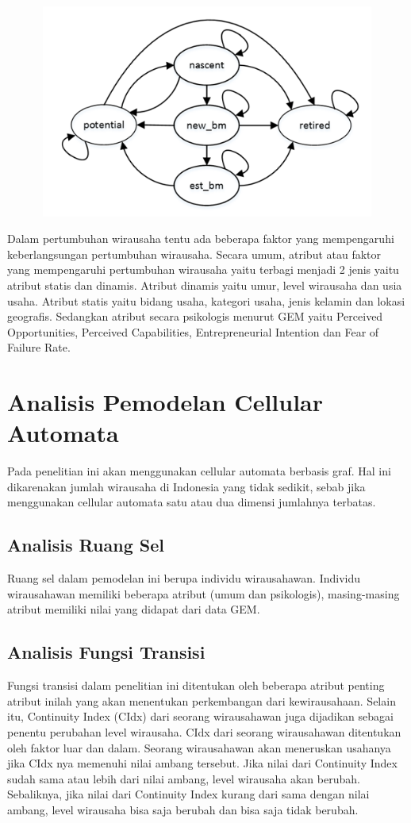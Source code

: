 \begin{figure} [H]
	\centering  
	\includegraphics[width=14cm, height=7cm]{tingkatwirausaha} 
	\label{fig:prosesWirausaha} 
\end{figure}


Dalam pertumbuhan wirausaha tentu ada beberapa faktor yang mempengaruhi keberlangsungan pertumbuhan wirausaha. Secara umum, atribut atau faktor yang mempengaruhi pertumbuhan wirausaha yaitu terbagi menjadi 2 jenis yaitu atribut statis dan dinamis. Atribut dinamis yaitu umur, level wirausaha dan usia usaha. Atribut statis yaitu bidang usaha, kategori usaha, jenis kelamin dan lokasi geografis. Sedangkan atribut secara psikologis menurut GEM yaitu Perceived Opportunities, Perceived Capabilities, Entrepreneurial Intention dan Fear of Failure Rate. 


\section{Analisis Pemodelan Cellular Automata}
\label{analisisCA}
Pada penelitian ini akan menggunakan cellular automata berbasis graf. Hal ini dikarenakan jumlah wirausaha di Indonesia yang tidak sedikit, sebab jika menggunakan cellular automata satu atau dua dimensi jumlahnya terbatas.

\subsection{Analisis Ruang Sel}
Ruang sel dalam pemodelan ini berupa individu wirausahawan. Individu wirausahawan memiliki beberapa atribut (umum dan psikologis), masing-masing atribut memiliki nilai yang didapat dari data GEM.

\subsection{Analisis Fungsi Transisi}
Fungsi transisi dalam penelitian ini ditentukan oleh beberapa atribut penting atribut inilah yang akan menentukan perkembangan dari kewirausahaan. Selain itu, Continuity Index (CIdx) dari seorang wirausahawan juga dijadikan sebagai penentu perubahan level wirausaha. CIdx dari seorang wirausahawan ditentukan oleh faktor luar dan dalam. Seorang wirausahawan akan meneruskan usahanya jika CIdx nya memenuhi nilai ambang tersebut. Jika nilai dari Continuity Index sudah sama atau lebih dari nilai ambang, level wirausaha akan berubah. Sebaliknya, jika nilai dari Continuity Index kurang dari sama dengan nilai ambang, level wirausaha bisa saja berubah dan bisa saja tidak berubah.

